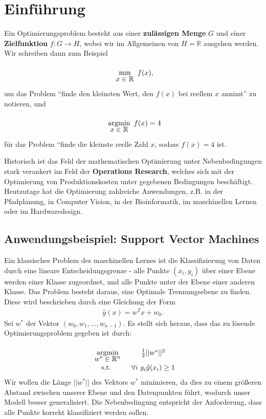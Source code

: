 \documentclass{report}
\newcommand{\tbf}{\textbf}
\newcommand{\argmin}[1] {
    \begin{array}{c}
        \vphantom{#1}\\[-3pt] %
        \text{argmin}\\[-3pt]
        #1\\
        \end{array}
    }
\renewcommand{\min}[1] {
    \begin{array}{c}
        \vphantom{#1}\\[-3pt] %
        \text{min}\\[-3pt]
        #1\\
        \end{array}
    }
\newcommand*{\newpar}{\par\vspace{\baselineskip}\noindent}
\begin{document}

\tableofcontents
\thispagestyle{fancy}
\chapter{Einführung}
Ein Optimierungsproblem besteht aus einer \tbf{zulässigen Menge} $G$ und einer \tbf{Zielfunktion} $f: G \to H$, wobei wir im Allgemeinen von $H = \mathbb{R}$ ausgehen werden. Wir schreiben dann zum Beispiel
\begin{align*}
 \min{x \in \mathbb{R}} f(x),
\end{align*}
um das Problem ``finde den kleinsten Wert, den $f(x)$ bei reellem $x$ annimt'' zu notieren, und
\begin{align*}
 \argmin{x \in \mathbb{R}} f(x) = 4
\end{align*}
für das Problem ``finde die kleinste reelle Zahl $x$, sodass $f(x) = 4$ ist.
\newpar
Historisch ist das Feld der mathematischen Optimierung unter Nebenbedingungen stark verankert im Feld der \tbf{Operations Research}, welches sich mit der Optimierung von Produktionskosten unter gegebenen Bedingungen beschäftigt. Heutzutage hat die Optimierung zahlreiche Anwendungen, z.B. in der Pfadplanung, in Computer Vision, in der Bioinformatik, im maschinellen Lernen oder im Hardwaredesign.
\section{Anwendungsbeispiel: Support Vector Machines}
Ein klassisches Problem des maschinellen Lernes ist die Klassifizierung von Daten durch eine lineare Entscheidungsgrenze - alle Punkte $(x_i,y_i)$ über einer Ebene werden einer Klasse zugeordnet, und alle Punkte unter der Ebene einer anderen Klasse. Das Problem besteht daraus, eine Optimale Trennungsebene zu finden. Diese wird beschrieben durch eine Gleichung der Form
\begin{align*}
 \hat{y}(x) = w^T x + w_0.
\end{align*}
Sei $w^*$ der Vektor $(w_0, w_1, \hdots, w_{n-1})$.
Es stellt sich heraus, dass das zu lösende Optimierungsproblem gegeben ist durch:
\begin{align*}
\begin{array}{cc}
\argmin{w^{*} \in \mathbb{R}^n} &\frac{1}{2} ||{w^*}||^2\\
 \text{s.t. } &\forall i\ y_i\hat{y}(x_i) \geq 1
\end{array}
\end{align*}
Wir wollen die Länge $||w^{*}||$ des Vektors $w^*$ minimieren, da dies zu einem größeren Abstand zwischen unserer Ebene und den Datenpunkten führt, wodurch unser Modell besser generalisiert. Die Nebenbedingung entspricht der Anforderung, dass alle Punkte korrekt klassifiziert werden sollen.
\end{document}
